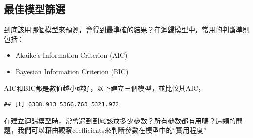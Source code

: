 \documentclass[
]{book}
\newenvironment{Shaded}{\begin{snugshade}}{\end{snugshade}}
\newcommand{\DataTypeTok}[1]{\textcolor[rgb]{0.13,0.29,0.53}{#1}}
\newcommand{\KeywordTok}[1]{\textcolor[rgb]{0.13,0.29,0.53}{\textbf{#1}}}
\newcommand{\NormalTok}[1]{#1}
\newcommand{\OperatorTok}[1]{\textcolor[rgb]{0.81,0.36,0.00}{\textbf{#1}}}
\providecommand{\tightlist}{%
  \setlength{\itemsep}{0pt}\setlength{\parskip}{0pt}}
\begin{document}
\hypertarget{ux6700ux4f73ux6a21ux578bux7be9ux9078}{%
\subsection{最佳模型篩選}\label{ux6700ux4f73ux6a21ux578bux7be9ux9078}}

到底該用哪個模型來預測，會得到最準確的結果？在迴歸模型中，常用的判斷準則包括：

\begin{itemize}
\tightlist
\item
  Akaike's Information Criterion (AIC)
\item
  Bayesian Information Criterion (BIC)
\end{itemize}

AIC和BIC都是數值越小越好，以下建立三個模型，並比較其AIC，

\begin{Shaded}
\end{Shaded}

\begin{verbatim}
## [1] 6338.913 5366.763 5321.972
\end{verbatim}

在建立迴歸模型時，常會遇到到底該放多少參數？所有參數都有用嗎？這類的問題，我們可以藉由觀察coefficients來判斷參數在模型中的``實用程度''

\begin{Shaded}
\end{Shaded}
\end{document}
